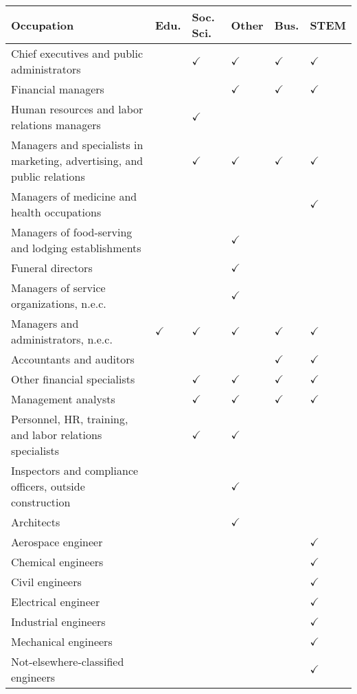 

\begin{tabular}[t]{llllll}
\toprule
Occupation & Edu. & Soc. Sci. & Other & Bus. & STEM\\
\midrule
Chief executives and public administrators &  & $\checkmark$ & $\checkmark$ & $\checkmark$ & $\checkmark$\\
Financial managers &  &  & $\checkmark$ & $\checkmark$ & $\checkmark$\\
Human resources and labor relations managers &  & $\checkmark$ &  &  & \\
Managers and specialists in marketing, advertising, and public relations &  & $\checkmark$ & $\checkmark$ & $\checkmark$ & $\checkmark$\\
Managers of medicine and health occupations &  &  &  &  & $\checkmark$\\
Managers of food-serving and lodging establishments &  &  & $\checkmark$ &  & \\
Funeral directors &  &  & $\checkmark$ &  & \\
Managers of service organizations, n.e.c. &  &  & $\checkmark$ &  & \\
Managers and administrators, n.e.c. & $\checkmark$ & $\checkmark$ & $\checkmark$ & $\checkmark$ & $\checkmark$\\
Accountants and auditors &  &  &  & $\checkmark$ & $\checkmark$\\
Other financial specialists &  & $\checkmark$ & $\checkmark$ & $\checkmark$ & $\checkmark$\\
Management analysts &  & $\checkmark$ & $\checkmark$ & $\checkmark$ & $\checkmark$\\
Personnel, HR, training, and labor relations specialists &  & $\checkmark$ & $\checkmark$ &  & \\
Inspectors and compliance officers, outside construction &  &  & $\checkmark$ &  & \\
Architects &  &  & $\checkmark$ &  & \\
Aerospace engineer &  &  &  &  & $\checkmark$\\
Chemical engineers &  &  &  &  & $\checkmark$\\
Civil engineers &  &  &  &  & $\checkmark$\\
Electrical engineer &  &  &  &  & $\checkmark$\\
Industrial engineers &  &  &  &  & $\checkmark$\\
Mechanical engineers &  &  &  &  & $\checkmark$\\
Not-elsewhere-classified engineers &  &  &  &  & $\checkmark$\\

\end{tabular}
